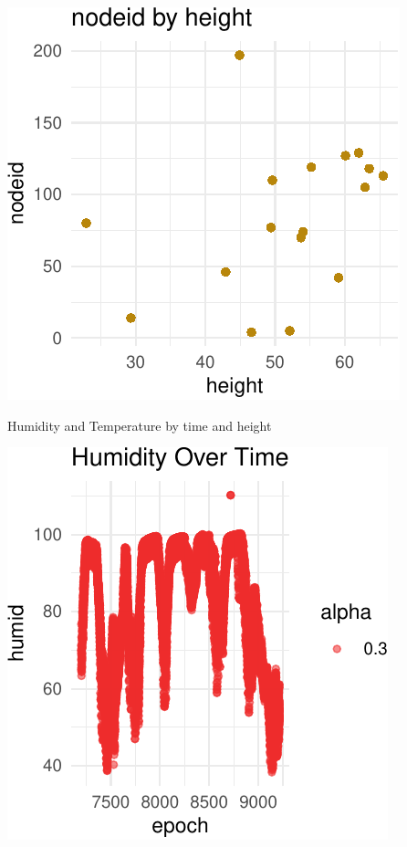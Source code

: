 \documentclass[]{article}
\begin{document}
\begin{center}\includegraphics{Project1WriteUp_files/figure-latex/unnamed-chunk-12-1} \end{center}

Humidity and Temperature by time and height

\begin{center}\includegraphics{Project1WriteUp_files/figure-latex/unnamed-chunk-13-1} \end{center}
\end{document}
